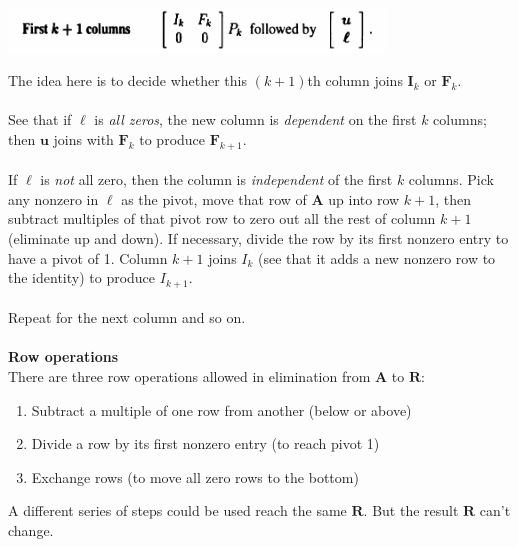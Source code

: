 \documentclass{report}
\begin{document}
\begin{center}
\includegraphics[width=10cm]{28}
\end{center}
The idea here is to decide whether this $(k+1)$th column joins $\bm I_k$ or $\bm F_k$.\\
\vspace{1mm}\\
See that if $\bm\ell$ is \textit{all zeros}, the new column is \textit{dependent} on the first $k$ columns; then $\bm u$ joins with $\bm F_k$ to produce 
$\bm F_{k+1}$.\\
\vspace{1mm}\\
If $\bm\ell$ is \textit{not} all zero, then the column is \textit{independent} of the first $k$ columns. Pick any nonzero in $\bm\ell$ as the pivot, move that row of 
$\bm A$ up into row $k+1$, then subtract multiples of that pivot row to zero out all the rest of column $k+1$ (eliminate up and down). If necessary, 
divide the row by its first nonzero entry to have a pivot of 1. Column $k+1$ joins $I_k$ (see that it adds a new nonzero row to the identity) to produce $I_{k+1}$.\\
\vspace{1mm}\\
Repeat for the next column and so on.\\
\vspace{1mm}\\
\textbf{Row operations}\\
There are three row operations allowed in elimination from $\bm A$ to $\bm R$:
\begin{enumerate}
\item Subtract a multiple of one row from another (below or above)
\item Divide a row by its first nonzero entry (to reach pivot 1)
\item Exchange rows (to move all zero rows to the bottom)
\end{enumerate}
A different series of steps could be used reach the same $\bm R$. But the result $\bm R$ can't change.
\newpage
\end{document}
